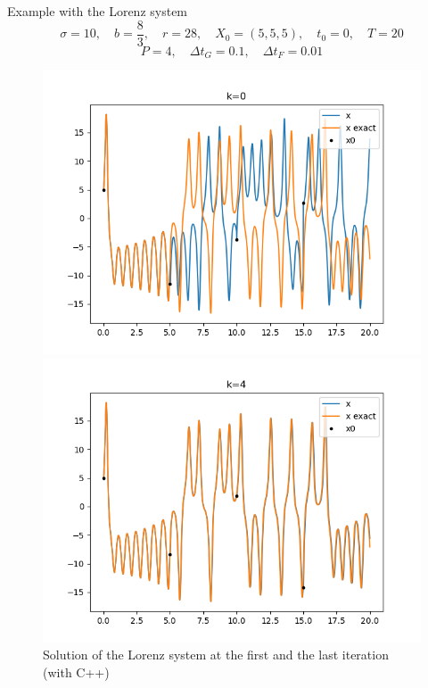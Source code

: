 \begin{frame}{Example with the Lorenz system}
	$$\sigma=10, \quad b=\frac{8}{3}, \quad r=28, \quad X_0=(5,5,5), \quad t_0=0, \quad T=20$$
	$$P=4,\quad \Delta t_G=0.1, \quad \Delta t_F=0.01$$
	\begin{figure}
		\centering
		\begin{minipage}{0.48\linewidth}
			\includegraphics[width=\linewidth]{"images/parareal/lorenz_sol_0.png"}
		\end{minipage}
		\begin{minipage}{0.48\linewidth}
			\includegraphics[width=\linewidth]{"images/parareal/lorenz_sol_4.png"}
		\end{minipage}
		\caption{Solution of the Lorenz system at the first and the last iteration (with C++)}
	\end{figure}
\end{frame}

